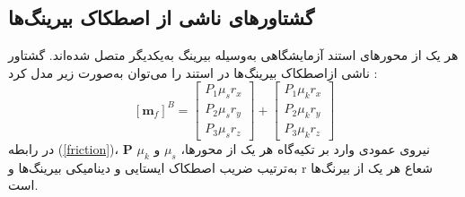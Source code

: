 \subsection{گشتاورهای ناشی از اصطكاک بیرينگ‌ها}\label{sec:friction}
هر یک از محورهای استند آزمایشگاهی به‌وسیله بیرینگ به‌یکدیگر متصل شده‌اند. گشتاور ناشی ازاصطکاک بیرینگ‌ها در استند را می‌توان به‌صورت زیر مدل کرد
\cite{Arabolye}:
\begin{equation}\label{friction}
	[\boldsymbol m_f]^B = \begin{bmatrix}
		P_1\mu_sr_x \\
		P_2\mu_sr_y \\
		P_3\mu_sr_z
	\end{bmatrix} + \begin{bmatrix}
	P_1\mu_kr_x \\
	P_2\mu_kr_y \\
	P_3\mu_kr_z
\end{bmatrix}
\end{equation}
در رابطه
(\ref{friction})، $\boldsymbol P$ نیروی عمودی وارد بر تکیه‌گاه هر یک از محورها، $\mu_s$ و $\mu_k$ به‌ترتیب ضریب اصطکاک
ایستایی و دینامیکی بیرینگ‌ها و r شعاع هر یک از بیرنگ‌ها است.

